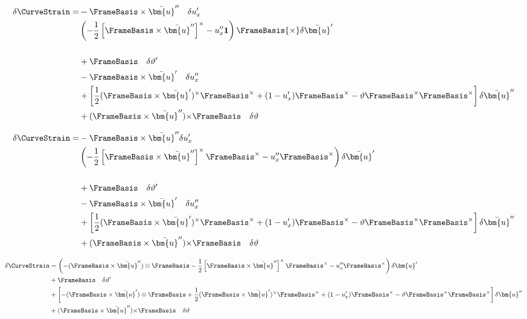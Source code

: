 $$
\begin{aligned}
\delta\CurveStrain 
=& 
-\FrameBasis \times\bar{\bm{u}}^{\prime\prime} ~~~ \delta u_x^{\prime}\\
%
&\left(-\frac{1}{2}\left[\FrameBasis \times\bar{\bm{u}}^{\prime\prime}\right]^{\times}  - u_x^{\prime\prime}\mathbf{1}\right)  \FrameBasis  {\times}\delta\bar{\bm{u}}^{\prime} \\
\\
&+ \FrameBasis  ~~~ \delta \vartheta^{\prime} \\
&-\FrameBasis \times\bar{\bm{u}}^{\prime} ~~~ \delta u_x^{\prime\prime} \\
&+\left[\frac{1}{2}(\FrameBasis \times\bar{\bm{u}}^{\prime})^\times\FrameBasis^\times  +(1-u_x^{\prime})\FrameBasis^{\times} - \vartheta\FrameBasis^{\times}\FrameBasis^{\times}\right] \delta \bar{\bm{u}}^{\prime\prime} \\
&+ (\FrameBasis \times\bar{\bm{u}}^{\prime\prime}) {\times} \FrameBasis  ~~~ \delta \vartheta
\end{aligned}
$$


$$
\begin{aligned}
\delta\CurveStrain 
=& 
-\FrameBasis \times\bar{\bm{u}}^{\prime\prime} \delta u_x^{\prime}\\
&\left(-\frac{1}{2}\left[\FrameBasis \times\bar{\bm{u}}^{\prime\prime}\right]^{\times}\FrameBasis^{\times}  - u_x^{\prime\prime}\FrameBasis^{\times}\right)  \delta\bar{\bm{u}}^{\prime} \\
\\
&+ \FrameBasis  ~~~ \delta \vartheta^{\prime} \\
&-\FrameBasis \times\bar{\bm{u}}^{\prime} ~~~ \delta u_x^{\prime\prime} \\
&+\left[\frac{1}{2}(\FrameBasis \times\bar{\bm{u}}^{\prime})^\times\FrameBasis^\times  +(1-u_x^{\prime})\FrameBasis^{\times} - \vartheta\FrameBasis^{\times}\FrameBasis^{\times}\right] \delta \bar{\bm{u}}^{\prime\prime} \\
&+ (\FrameBasis \times\bar{\bm{u}}^{\prime\prime}) {\times} \FrameBasis  ~~~ \delta \vartheta
\end{aligned}
$$

$$
\begin{aligned}
\delta\CurveStrain &= 
\left(-(\FrameBasis \times\bar{\bm{u}}^{\prime\prime}) \otimes\FrameBasis  -\frac{1}{2}\left[\FrameBasis \times\bar{\bm{u}}^{\prime\prime}\right]^{\times}\FrameBasis^{\times}  - u_x^{\prime\prime}\FrameBasis^{\times}\right)  \delta \bm{u}^{\prime} \\
&+ \FrameBasis  ~~~ \delta \vartheta^{\prime} \\
&+\left[-(\FrameBasis \times\bar{\bm{u}}^{\prime})\otimes \FrameBasis  + \frac{1}{2}(\FrameBasis \times\bar{\bm{u}}^{\prime})^\times\FrameBasis^\times  +(1-u_x^{\prime})\FrameBasis^{\times} - \vartheta\FrameBasis^{\times}\FrameBasis^{\times}\right] \delta \bm{u}^{\prime\prime} \\
&+(\FrameBasis \times\bar{\bm{u}}^{\prime\prime}) {\times} \FrameBasis  ~~~ \delta \vartheta
\end{aligned}
$$


